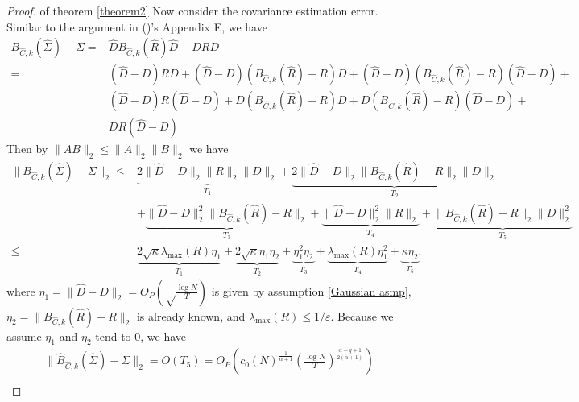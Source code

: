 \begin{proof}{of theorem \ref{theorem2}}
Now consider the covariance estimation error. Similar to the argument in (\cite{liu2014EC2})'s Appendix E, we have 
\begin{equation}
	\begin{split}
		B_{\hat C, k}(\hat \Sigma) - \Sigma =& \hat D B_{\hat C, k}(\hat R) \hat D - DRD \\
        =& (\hat D - D) R D + (\hat D - D) (B_{\hat C, k}(\hat R) - R) D + (\hat D - D) (B_{\hat C, k}(\hat R) - R) (\hat D - D) + \\
    	& (\hat D - D) R (\hat D - D) + D (B_{\hat C, k}(\hat R) - R) D + D (B_{\hat C, k}(\hat R) - R) (\hat D - D) + \\
        & DR(\hat D - D)
	\end{split}
    \label{cov decompose}
\end{equation}
Then by $\|AB\|_2 \leq \|A\|_2 \|B\|_2$ we have 
\begin{equation}
	\begin{split}
		\lVert B_{\hat C, k}(\hat \Sigma) - \Sigma \rVert_2 \leq & 
		    \underbrace{ 2 \lVert \hat D -	D \rVert_2 \lVert R \rVert_2 \lVert D \rVert_2 }_{T_1} + 
		    \underbrace{ 2\lVert \hat D - D \rVert_2 \lVert B_{\hat C, k}(\hat R) - R \rVert_2 \lVert D \rVert_2 }_{T_2} \\
	    & + \underbrace{ \lVert \hat D - D \rVert_2^2 \lVert B_{\hat C, k}(\hat R) - R \rVert_2 }_{T_3} + 
	        \underbrace{ \lVert \hat D - D \rVert_2^2 \lVert R \rVert_2 }_{T_4} + 
	        \underbrace{ \lVert B_{\hat C, k}(\hat R) - R \rVert_2 \lVert D \rVert_2^2 }_{T_5} \\
        \leq & \underbrace{ 2 \sqrt{\kappa} \lambda_{\max } (R) \eta_1     }_{T_1} + 
            \underbrace{ 2\sqrt{\kappa} \eta_1 \eta_2}_{T_2} + 
            \underbrace{ \eta_1^2 \eta_2 }_{T_3} + 
            \underbrace{ \lambda_{\max}(R) \eta_1^2 }_{T_4} + 
            \underbrace{\kappa \eta_2}_{T_5} .
    \end{split}
    \label{cor2cov 2}
\end{equation}
where $\eta_1 =  \lVert \hat D - D \rVert_2 = O_P( \sqrt\frac{\log N}{T} )$ is given by assumption \ref{Gaussian asmp}, $\eta_2 = \lVert B_{\hat C, k}(\hat R) - R \rVert_2$ is already known, and $\lambda_{\max} (R) \leq 1/\varepsilon$. Because we assume $\eta_1$ and $\eta_2$ tend to $0$, we have  
\begin{equation}
	\begin{split}
		\lVert \hat B_{\hat C, k}(\hat \Sigma) - \Sigma \rVert_2 
        	= O( T_5 ) 
        = O_P (  
        	c_0(N)^\frac{1}{\alpha+1}  
            ( \frac{\log N}{T} )^\frac{\alpha-q+1}{2(\alpha+1)}  ) \\
	\end{split}	
\end{equation}
\end{proof}

